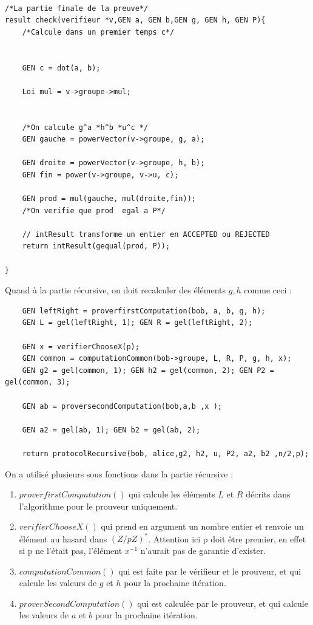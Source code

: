 \documentclass[a4paper]{article}
\theoremstyle{theorem}
\theoremstyle{definition}
\begin{document}
\begin{lstlisting}
    
/*La partie finale de la preuve*/
result check(verifieur *v,GEN a, GEN b,GEN g, GEN h, GEN P){
    /*Calcule dans un premier temps c*/

    
    GEN c = dot(a, b);
    
    Loi mul = v->groupe->mul;


    /*On calcule g^a *h^b *u^c */
    GEN gauche = powerVector(v->groupe, g, a);
   
    GEN droite = powerVector(v->groupe, h, b);
    GEN fin = power(v->groupe, v->u, c);

    GEN prod = mul(gauche, mul(droite,fin));
    /*On verifie que prod  egal a P*/

    // intResult transforme un entier en ACCEPTED ou REJECTED
    return intResult(gequal(prod, P));

}

\end{lstlisting}
Quand à la partie récursive, on doit recalculer des éléments $g,h$ comme ceci :
  \begin{lstlisting}
    GEN leftRight = proverfirstComputation(bob, a, b, g, h);
    GEN L = gel(leftRight, 1); GEN R = gel(leftRight, 2);

    GEN x = verifierChooseX(p);
    GEN common = computationCommon(bob->groupe, L, R, P, g, h, x);
    GEN g2 = gel(common, 1); GEN h2 = gel(common, 2); GEN P2 = gel(common, 3);

    GEN ab = proversecondComputation(bob,a,b ,x );

    GEN a2 = gel(ab, 1); GEN b2 = gel(ab, 2);
      
    return protocolRecursive(bob, alice,g2, h2, u, P2, a2, b2 ,n/2,p);

  \end{lstlisting}

On a utilisé plusieurs sous fonctions dans la partie récursive :

\begin{enumerate}
    \item $proverfirstComputation()$ qui calcule les éléments $L$ et $R$ décrits dans l'algorithme pour le prouveur uniquement.
    \item $verifierChooseX()$ qui prend en argument un nombre entier et renvoie un élément au hasard dans $(Z/pZ)^*$. Attention ici p doit être premier, en effet si p ne l'était pas, l'élément $x^{-1}$ n'aurait pas de garantie d'exister.
    \item $computationCommon()$ qui est faite par le vérifieur et le prouveur, et qui calcule les valeurs de $g$ et $h$ pour la prochaine itération.
    \item $proverSecondComputation()$ qui est calculée par le prouveur, et qui calcule les valeurs de $a$ et $b$ pour la prochaine itération.
\end{enumerate}
\end{document}
